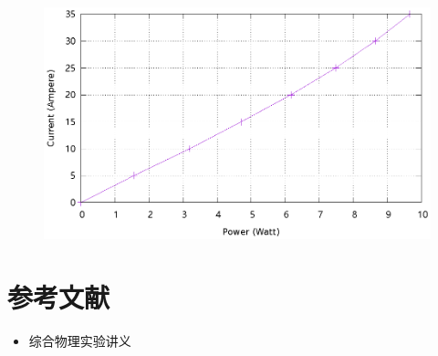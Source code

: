 \documentclass{ctexart}
\begin{document}
\begin{figure}[H]
    \centering
    \includegraphics[width=0.9\linewidth]{../output/led-pc-8.gnuplot}
\end{figure}
\newpage


\section{参考文献}
\begin{itemize}[leftmargin=0pt]
    \item[] 综合物理实验讲义
\end{itemize}
\end{document}
